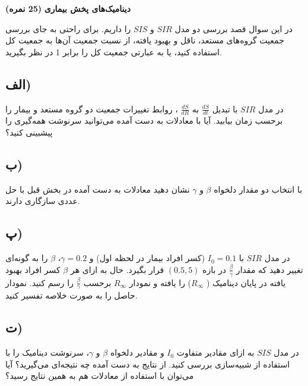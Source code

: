 \Large \textbf{دینامیک‌های پخش بیماری}
\large \textbf{(25 نمره)}

\normalsize \vspace{0.5cm}
در این سوال قصد بررسی دو مدل 
$SIR$ و $SIS$ را داریم. برای راحتی به جای بررسی جمعیت گروه‌های مستعد، ناقل و بهبود یافته، از نسبت جمعیت آن‌ها به جمعیت کل استفاده کنید، یا به عبارتی جمعیت کل را برابر 1 در نظر بگیرید.
\subsection*{الف)}
در مدل 
$SIR$ 
با تبدیل 
$\frac{dS}{dt}$ به
$\frac{dS}{dR}$ ، روابط تغییرات جمعیت دو گروه مستعد و بیمار را برحسب زمان بیابید. آیا با معادلات به دست آمده می‌توانید سرنوشت همه‌گیری را پیشبینی کنید؟ 
\subsection*{ب)}
با انتخاب دو مقدار دلخواه 
$\beta$ و $\gamma$ نشان دهید معادلات به دست آمده در بخش قبل با حل عددی سازگاری دارند.

\subsection*{پ)}
در مدل 
$SIR$ 
با 
$I_0=0.1$ (کسر افراد بیمار در لحظه اول) و 
$\gamma=0.2$، 
$\beta$ را به گونه‌ای تغییر دهید که مقدار 
$\frac{\beta}{\gamma}$ در بازه 
$(0.5,5)$ قرار بگیرد. حال به ازای هر 
$\beta$ کسر افراد بهبود یافته در پایان دینامیک (
$R_{\infty}$) را یافته و نمودار 
$R_{\infty}$ برحسب 
$\frac{\beta}{\gamma}$ را رسم کنید. نمودار حاصل را به صورت خلاصه تفسیر کنید.
\subsection*{ت)}
در مدل 
$SIS$
به ازای مقادیر متفاوت 
$I_0$ و مقادیر دلخواه
$\beta$ و $\gamma$، سرنوشت دینامیک را با استفاده از شبیه‌سازی بررسی کنید. از 
نتایج به دست آمده چه نتیجه‌ای می‌گیرید؟
آیا می‌توان با استفاده از معادلات هم به همین نتایج رسید؟
